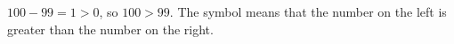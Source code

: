 $ 100-99=1>0 $, so $\boxed{100>99}$. The symbol means that the number on the left is greater than the number on the right.
